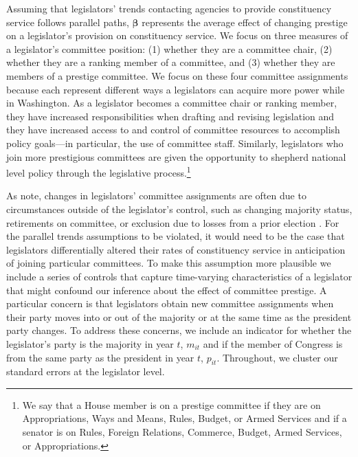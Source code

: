 \documentclass[12pt]{article}
\begin{document}
Assuming that legislators' trends contacting agencies to provide constituency service follows parallel paths, $\boldsymbol{\beta}$ represents the average effect of changing prestige on a legislator's provision on constituency service. We focus on three measures of a legislator's committee position: (1) whether they are a committee chair, (2) whether they are a ranking member of a committee, and (3) whether they are members of a prestige committee. We focus on these four committee assignments because each represent different ways a legislators can acquire more power while in Washington. As a legislator becomes a committee chair or ranking member, they have increased responsibilities when drafting and revising legislation and they have increased access to and control of committee resources to accomplish policy goals---in particular, the use of committee staff. Similarly, legislators who join more prestigious committees are given the opportunity to shepherd national level policy through the legislative process.\footnote{We say that a House member is on a prestige committee if they are on Appropriations, Ways and Means, Rules, Budget, or Armed Services and if a senator is on Rules, Foreign Relations, Commerce, Budget, Armed Services, or Appropriations.} 

As \cite{BerryFowler2016} note, changes in legislators' committee assignments are often due to circumstances outside of the legislator's control, such as changing majority status, retirements on committee, or exclusion due to losses from a prior election \citep{GrimmerPowell2013}. For the parallel trends assumptions to be violated, it would need to be the case that legislators differentially altered their rates of constituency service in anticipation of joining particular committees. To make this assumption more plausible we include a series of controls that capture time-varying characteristics of a legislator that might confound our inference about the effect of committee prestige. A particular concern is that legislators obtain new committee assignments when their party moves into or out of the majority or at the same time as the president party changes. To address these concerns, we include an indicator for whether the legislator's party is the majority in year $t$, $m_{it}$ and if the member of Congress is from the same party as the president in year $t$, $p_{it}$. Throughout, we cluster our standard errors at the legislator level.
\end{document}

